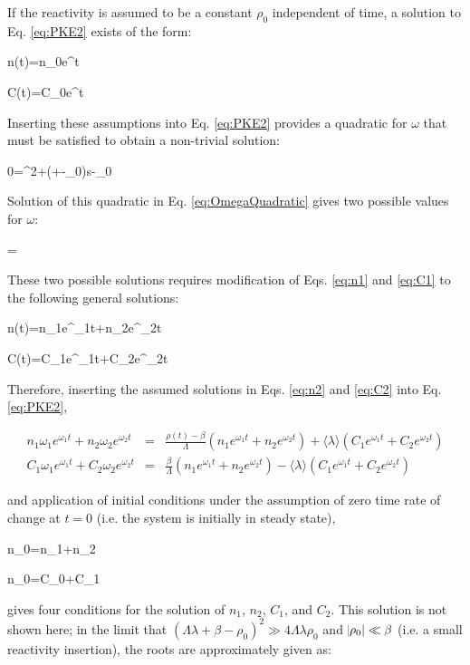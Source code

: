 If the reactivity is assumed to be a constant \(\rho_0\) independent of time, a solution to Eq. \eqref{eq:PKE2} exists of the form:

\beq
\label{eq:n1}
n(t)=n_0e^{\omega t}
\eeq

\beq
\label{eq:C1}
C(t)=C_0e^{\omega t}
\eeq

Inserting these assumptions into Eq. \eqref{eq:PKE2} provides a quadratic for \(\omega\) that must be satisfied to obtain a non-trivial solution:

\beq
\label{eq:OmegaQuadratic}
0=\Lambda\omega^2+\left(\lambda\Lambda+\beta-\rho_0\right)s-\rho_0\lambda
\eeq

Solution of this quadratic in Eq. \eqref{eq:OmegaQuadratic} gives two possible values for \(\omega\):

\beq
\omega=
\eeq

These two possible solutions requires modification of Eqs. \eqref{eq:n1} and \eqref{eq:C1} to the following general solutions:

\beq
\label{eq:n2}
n(t)=n_1e^{\omega_1t}+n_2e^{\omega_2t}
\eeq

\beq
\label{eq:C2}
C(t)=C_1e^{\omega_1t}+C_2e^{\omega_2t}
\eeq

Therefore, inserting the assumed solutions in Eqs. \eqref{eq:n2} and \eqref{eq:C2} into Eq. \eqref{eq:PKE2},

\begin{subequations}
\label{eq:PKE3}
\begin{eqnarray}
n_1\omega_1e^{\omega_1t}+n_2\omega_2e^{\omega_2t}&=&\frac{\rho(t)-\beta}{\Lambda}\left(n_1e^{\omega_1t}+n_2e^{\omega_2t}\right)+\langle\lambda\rangle \left(C_1e^{\omega_1t}+C_2e^{\omega_2t}\right)\\
C_1\omega_1e^{\omega_1t}+C_2\omega_2e^{\omega_2t}&=&\frac{\beta}{\Lambda}\left(n_1e^{\omega_1t}+n_2e^{\omega_2t}\right)-\langle\lambda\rangle \left(C_1e^{\omega_1t}+C_2e^{\omega_2t}\right)
\end{eqnarray}
\end{subequations}

and application of initial conditions under the assumption of zero time rate of change at \(t=0\) (i.e. the system is initially in steady state), 

\beq
n_0=n_1+n_2
\eeq

\beq
\frac{\beta}{\Lambda\langle\lambda\rangle}n_0=C_0+C_1
\eeq

gives four conditions for the solution of \(n_1\), \(n_2\), \(C_1\), and \(C_2\). This solution is not shown here; in the limit that \((\Lambda\lambda+\beta-\rho_0)^2 \gg 4\Lambda\lambda\rho_0\) and \(\abs{\rho_0}\ll\beta\) (i.e. a small reactivity insertion), the roots are approximately given as:

